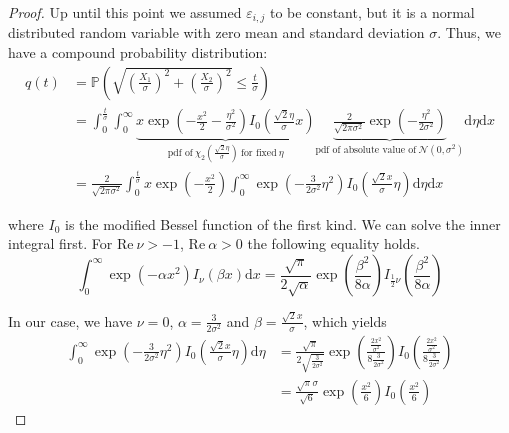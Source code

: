 \documentclass[a4paper,12pt]{article}
\theoremstyle{plain}
\theoremstyle{definition}
\begin{document}
\begin{proof}
	Up until this point we assumed $\varepsilon_{i, j}$ to be constant, but it is a normal distributed random variable with zero mean and standard deviation $\sigma$. Thus, we have a compound probability distribution:
	\begin{align*}
		q(t) &= \mathbb{P}\left( \sqrt{\left( \frac{X_1}{\sigma} \right)^2 + \left( \frac{X_2}{\sigma} \right)^2} \leq \frac{t}{\sigma} \right) \\
		&= \int_0^\frac{t}{\sigma} \int_0^\infty \underbrace{x \exp \left( - \frac{x^2}{2} - \frac{\eta^2}{\sigma^2} \right) I_0 \left( \frac{\sqrt{2} \eta}{\sigma} x \right)}_{\textrm{pdf of} \ \chi_2 \left( \frac{\sqrt{2} \eta}{\sigma} \right) \ \textrm{for fixed} \ \eta} \underbrace{\frac{2}{\sqrt{2 \pi \sigma^2}} \exp \left( - \frac{\eta^2}{2 \sigma^2} \right)}_{\textrm{pdf of absolute value of} \ \mathcal{N}(0, \sigma^2)} \mathrm{d}\eta \mathrm{d}x \\
		&= \frac{2}{\sqrt{2 \pi \sigma^2}} \int_0^\frac{t}{\sigma} x \exp \left( - \frac{x^2}{2} \right) \int_0^\infty \exp \left( - \frac{3}{2 \sigma^2} \eta^2 \right) I_0 \left( \frac{\sqrt{2} x}{\sigma} \eta \right) \mathrm{d}\eta \mathrm{d}x
	\end{align*}
	
	where $I_0$ is the modified Bessel function of the first kind. We can solve the inner integral first. For $\mathrm{Re} \ \nu > -1$, $\mathrm{Re} \ \alpha > 0$ the following equality holds\cite{TISP}.
	\begin{equation}\label{eqintbessel}
		\int_0^\infty \exp \left( - \alpha x^2 \right) I_\nu ( \beta x ) \mathrm{d}x = \frac{\sqrt{\pi}}{2 \sqrt{\alpha}} \exp \left( \frac{\beta^2}{8 \alpha} \right) I_{\frac{1}{2} \nu} \left( \frac{\beta^2}{8 \alpha} \right)
	\end{equation}
	
	In our case, we have $\nu = 0$, $\alpha = \frac{3}{2 \sigma^2}$ and $\beta = \frac{\sqrt{2} x}{\sigma}$, which yields
	\begin{align*}
		\int_0^\infty \exp \left( - \frac{3}{2 \sigma^2} \eta^2 \right) I_0 \left( \frac{\sqrt{2} x}{\sigma} \eta \right) \mathrm{d}\eta &= \frac{\sqrt{\pi}}{2 \sqrt{\frac{3}{2 \sigma^2}}} \exp \left( \frac{\frac{2 x^2}{\sigma^2}}{8 \frac{3}{2 \sigma^2}} \right) I_0 \left( \frac{\frac{2 x^2}{\sigma^2}}{8 \frac{3}{2 \sigma^2}} \right) \\
		&= \frac{\sqrt{\pi} \sigma}{\sqrt{6}} \exp \left( \frac{x^2}{6} \right) I_0 \left( \frac{x^2}{6} \right)
	\end{align*}
	

\end{proof}
\end{document}
